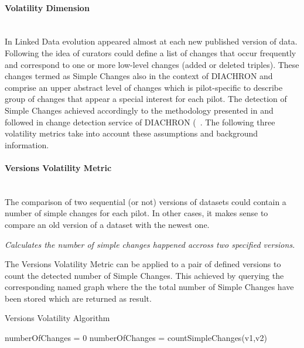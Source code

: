 \paragraph{Volatility Dimension}~\\ %
In Linked Data evolution appeared almost at each new published version of data. Following the idea of \cite{TODS13} curators could define a list of changes that occur frequently and correspond to one or more low-level changes (added or deleted triples). These changes termed as Simple Changes also in the context of DIACHRON and comprise an upper abstract level of changes which is pilot-specific to describe group of changes that appear a special interest for each pilot. The detection of Simple Changes achieved accordingly to the methodology presented in \cite{TODS13} and followed in change detection service of DIACHRON (~\cite{D3.1}. The following three volatility metrics take into account these assumptions and background information.

\paragraph{Versions Volatility Metric} ~\\ %
The comparison of two sequential (or not) versions of datasets could contain a number of simple changes for each pilot. In other cases, it makes sense to compare an old version of a dataset with the newest one. 

\begin{mdframed}[style=metricdefinition]
\emph{Calculates the number of simple changes happened accross two specified versions.}
\end{mdframed}

The Versions Volatility Metric can be applied to a pair
of defined versions to count the detected number of Simple Changes. This achieved by querying the corresponding named graph where the the total number of Simple Changes have been stored which are returned as result. 

\begin{algorithm}
\caption{Versions Volatility Algorithm}
\begin{algorithmic}[1]
\State numberOfChanges = 0
\EndProcedure
{}
\State numberOfChanges = countSimpleChanges(v1,v2)
\EndProcedure
\State {}
\end{algorithmic}
\end{algorithm}

